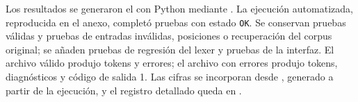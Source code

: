 Los resultados se generaron el \FechaValidacion{} con Python \PythonValidacion{} mediante . La ejecución automatizada, reproducida en el anexo, completó \PruebasTotal{} pruebas con estado \texttt{OK}. Se conservan \PruebasValidasBase{} pruebas válidas y \PruebasInvalidasBase{} pruebas de entradas inválidas, posiciones o recuperación del corpus original; se añaden \PruebasRegresion{} pruebas de regresión del lexer y \PruebasCLI{} pruebas de la interfaz. El archivo válido produjo \TokensValidos{} tokens y \ErroresValidos{} errores; el archivo con errores produjo \TokensInvalidos{} tokens, \ErroresInvalidos{} diagnósticos y código de salida 1. Las cifras se incorporan desde , generado a partir de la ejecución, y el registro detallado queda en .

